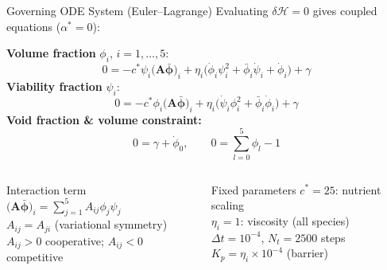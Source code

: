 \documentclass[aspectratio=169,10pt]{beamer}
\newcommand{\bphi}{\boldsymbol{\phi}}
\begin{document}
\begin{frame}[t]{Governing ODE System (Euler--Lagrange)}
  \small
  Evaluating $\delta\mathcal{H}=0$ gives coupled equations ($\alpha^*=0$):
  \vspace{2pt}

  \textbf{Volume fraction} $\phi_i$, $i=1,\dots,5$:
  \[
    \boxed{
      0 = -c^*\psi_i\bigl(\mathbf{A}\bar{\bphi}\bigr)_i
      + \eta_i\bigl(\dot\phi_i\psi_i^2 + \bar\phi_i\dot\psi_i + \dot\phi_i\bigr)
      + \gamma
    }
  \]
  \vspace{2pt}
  \textbf{Viability fraction} $\psi_i$:
  \[
    \boxed{
      0 = -c^*\phi_i\bigl(\mathbf{A}\bar{\bphi}\bigr)_i
      + \eta_i\bigl(\dot\psi_i\phi_i^2 + \bar\phi_i\dot\phi_i\bigr)
      + \gamma
    }
  \]
  \vspace{2pt}
  \textbf{Void fraction \& volume constraint:}
  \[
    0 = \gamma + \dot\phi_0,
    \qquad
    0 = \sum_{l=0}^{5}\phi_l - 1
  \]
  \vspace{1pt}
  \begin{columns}[T]
      \begin{block}{Interaction term}
        $\bigl(\mathbf{A}\bar{\bphi}\bigr)_i = \displaystyle\sum_{j=1}^{5}A_{ij}\phi_j\psi_j$\\[3pt]
        $A_{ij}=A_{ji}$ (variational symmetry)\\
        $A_{ij}>0$ cooperative; $A_{ij}<0$ competitive
      \end{block}
      \begin{block}{Fixed parameters}
        $c^*=25$: nutrient scaling\\
        $\eta_i=1$: viscosity (all species)\\
        $\Delta t=10^{-4}$, $N_t=2500$ steps\\
        $K_p = \eta_i\times10^{-4}$ (barrier)
      \end{block}
  \end{columns}
\end{frame}
\end{document}
